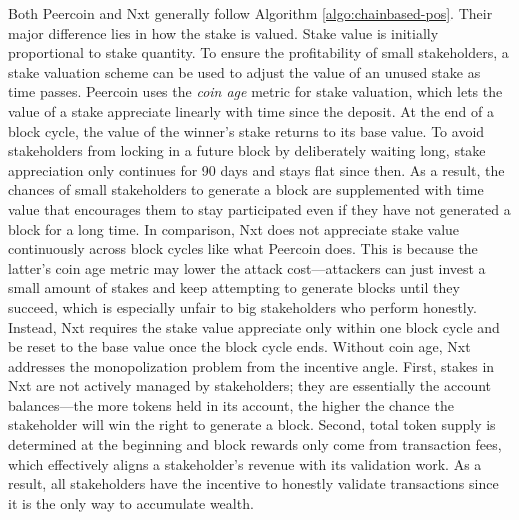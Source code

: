Both Peercoin  and Nxt  generally follow Algorithm \ref{algo:chainbased-pos}. Their major difference lies in how the stake is valued. Stake value is initially proportional to stake quantity. To ensure the profitability of small stakeholders, a stake valuation scheme can be used to adjust the value of an unused stake as time passes.
Peercoin uses the \textit{coin age} metric for stake valuation, which lets the value of a stake appreciate linearly with time since the deposit. At the end of a block cycle, the value of the winner's stake returns to its base value. To avoid stakeholders from locking in a future block by deliberately waiting long, stake appreciation only continues for 90 days and stays flat since then. As a result, the chances of small stakeholders to generate a block are supplemented with time value that encourages them to stay participated even if they have not generated a block for a long time.
In comparison, Nxt does not appreciate stake value continuously across block cycles like what Peercoin does. This is because the latter's coin age metric may lower the attack cost---attackers can just invest a small amount of stakes and keep attempting to generate blocks until they succeed, which is especially unfair to big stakeholders who perform honestly. Instead, Nxt requires the stake value appreciate only within one block cycle and be reset to the base value once the block cycle ends. Without coin age, Nxt addresses the monopolization problem from the incentive angle. First, stakes in Nxt are not actively managed by stakeholders; they are essentially the account balances---the more tokens held in its account, the higher the chance the stakeholder will win the right to generate a block. Second, total token supply is determined at the beginning and block rewards only come from transaction fees, which effectively aligns a stakeholder's revenue with its validation work. As a result, all stakeholders have the incentive to honestly validate transactions since it is the only way to accumulate wealth.

